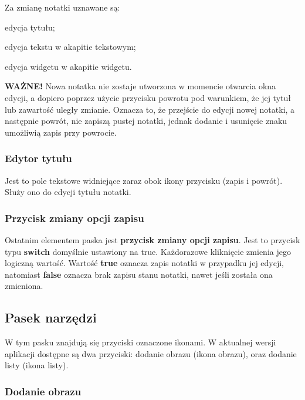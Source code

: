 Za zmianę notatki uznawane są:

\begin{compactitem}
    \item edycja tytułu;
    \item edycja tekstu w akapitie tekstowym;
    \item edycja widgetu w akapitie widgetu.
\end{compactitem}
\vspace{5mm}

\textbf{WAŻNE!} Nowa notatka nie zostaje utworzona w momencie otwarcia okna edycji, a dopiero poprzez użycie przycisku powrotu pod warunkiem, że jej tytuł lub zawartość uległy zmianie. Oznacza to, że przejście do edycji nowej notatki, a następnie powrót, nie zapiszą pustej notatki, jednak dodanie i usunięcie znaku umożliwią zapis przy powrocie.

\subsubsection{Edytor tytułu}

Jest to pole tekstowe widniejące zaraz obok ikony przycisku (zapis i powrót). Służy ono do edycji tytułu notatki.

\subsubsection{Przycisk zmiany opcji zapisu}

Ostatnim elementem paska jest \textbf{przycisk zmiany opcji zapisu}. Jest to przycisk typu \textbf{switch} domyślnie ustawiony na true. Każdorazowe kliknięcie zmienia jego logiczną wartość.
Wartość \textbf{true} oznacza zapis notatki w przypadku jej edycji, natomiast \textbf{false} oznacza brak zapisu stanu notatki, nawet jeśli została ona zmieniona.

\subsection{Pasek narzędzi}

W tym pasku znajdują się przyciski oznaczone ikonami.
W aktualnej wersji aplikacji dostępne są dwa przyciski: dodanie obrazu (ikona obrazu), oraz dodanie listy (ikona listy).

\subsubsection{Dodanie obrazu}

